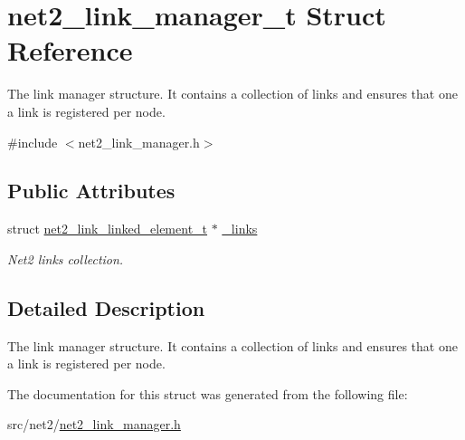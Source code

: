 \hypertarget{structnet2__link__manager__t}{}\section{net2\+\_\+link\+\_\+manager\+\_\+t Struct Reference}
\label{structnet2__link__manager__t}


The link manager structure. It contains a collection of links and ensures that one a link is registered per node.  




{\ttfamily \#include $<$net2\+\_\+link\+\_\+manager.\+h$>$}

\subsection*{Public Attributes}
\begin{DoxyCompactItemize}
\item 
\hypertarget{structnet2__link__manager__t_af6acfc2ac12140909d049f52d881d78a}{}struct \hyperlink{structnet2__link__linked__element__t}{net2\+\_\+link\+\_\+linked\+\_\+element\+\_\+t} $\ast$ \hyperlink{structnet2__link__manager__t_af6acfc2ac12140909d049f52d881d78a}{\+\_\+links}\label{structnet2__link__manager__t_af6acfc2ac12140909d049f52d881d78a}

\begin{DoxyCompactList}\small\item\em Net2 links collection. \end{DoxyCompactList}\end{DoxyCompactItemize}


\subsection{Detailed Description}
The link manager structure. It contains a collection of links and ensures that one a link is registered per node. 

The documentation for this struct was generated from the following file\+:\begin{DoxyCompactItemize}
\item 
src/net2/\hyperlink{net2__link__manager_8h}{net2\+\_\+link\+\_\+manager.\+h}\end{DoxyCompactItemize}
